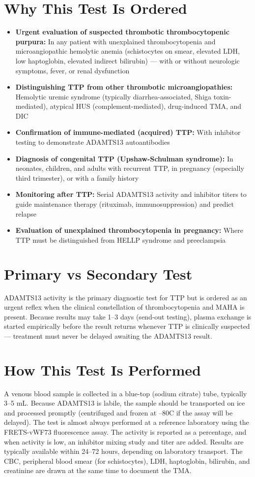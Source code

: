 \section*{Why This Test Is Ordered}
\begin{itemize}
  \item \textbf{Urgent evaluation of suspected thrombotic thrombocytopenic purpura:} In any patient with unexplained thrombocytopenia and microangiopathic hemolytic anemia (schistocytes on smear, elevated LDH, low haptoglobin, elevated indirect bilirubin) --- with or without neurologic symptoms, fever, or renal dysfunction
  \item \textbf{Distinguishing TTP from other thrombotic microangiopathies:} Hemolytic uremic syndrome (typically diarrhea-associated, Shiga toxin-mediated), atypical HUS (complement-mediated), drug-induced TMA, and DIC
  \item \textbf{Confirmation of immune-mediated (acquired) TTP:} With inhibitor testing to demonstrate ADAMTS13 autoantibodies
  \item \textbf{Diagnosis of congenital TTP (Upshaw-Schulman syndrome):} In neonates, children, and adults with recurrent TTP, in pregnancy (especially third trimester), or with a family history
  \item \textbf{Monitoring after TTP:} Serial ADAMTS13 activity and inhibitor titers to guide maintenance therapy (rituximab, immunosuppression) and predict relapse
  \item \textbf{Evaluation of unexplained thrombocytopenia in pregnancy:} Where TTP must be distinguished from HELLP syndrome and preeclampsia
\end{itemize}

\section*{Primary vs Secondary Test}
ADAMTS13 activity is the primary diagnostic test for TTP but is ordered as an urgent reflex when the clinical constellation of thrombocytopenia and MAHA is present. Because results may take 1--3 days (send-out testing), plasma exchange is started empirically before the result returns whenever TTP is clinically suspected --- treatment must never be delayed awaiting the ADAMTS13 result.

\section*{How This Test Is Performed}
A venous blood sample is collected in a blue-top (sodium citrate) tube, typically 3--5 mL. Because ADAMTS13 is labile, the sample should be transported on ice and processed promptly (centrifuged and frozen at --80\textdegree{}C if the assay will be delayed). The test is almost always performed at a reference laboratory using the FRETS-vWF73 fluorescence assay. The activity is reported as a percentage, and when activity is low, an inhibitor mixing study and titer are added. Results are typically available within 24--72 hours, depending on laboratory transport. The CBC, peripheral blood smear (for schistocytes), LDH, haptoglobin, bilirubin, and creatinine are drawn at the same time to document the TMA.

